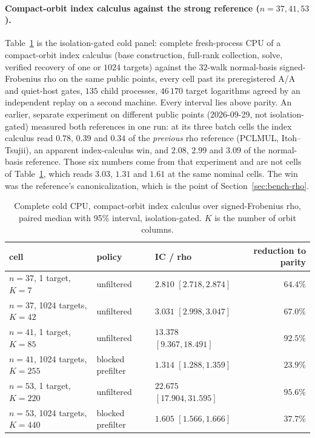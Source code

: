 \paragraph{Compact-orbit index calculus against the strong reference ($n=37,41,53$).}
Table~\ref{tab:cold} is the isolation-gated cold panel: complete
fresh-process CPU of a compact-orbit index calculus (base
construction, full-rank collection, solve, verified recovery of one or
$1024$ targets) against the $32$-walk normal-basis signed-Frobenius
rho on the same public points, every cell past its preregistered A/A
and quiet-host gates, $135$ child processes, $46\,170$ target
logarithms agreed by an independent replay on a second
machine.
Every interval lies above parity. An earlier, separate experiment on
different public points (2026-09-29, not isolation-gated) measured both
references in one run: at its three batch cells the index calculus
read $0.78$, $0.39$ and $0.34$ of the \emph{previous} rho reference
(PCLMUL, Itoh--Tsujii), an apparent index-calculus win, and $2.08$,
$2.99$ and $3.09$ of the normal-basis reference. Those six numbers
come from that experiment and are not cells of Table~\ref{tab:cold},
which reads $3.03$, $1.31$ and $1.61$ at the same nominal cells. The
win was the reference's canonicalization, which is the point of
Section~\ref{sec:bench-rho}.

\begin{table}[t]
\centering\small
\caption{Complete cold CPU, compact-orbit index calculus over signed-Frobenius rho, paired median with 95\% interval, isolation-gated. $K$ is the number of orbit columns.}
\label{tab:cold}
\begin{tabular}{@{}lllr@{}}
\toprule
cell & policy & IC / rho & reduction to parity \\
\midrule
$n=37$, 1 target, $K=7$ & unfiltered & $2.810$ $[2.718,2.874]$ & $64.4\%$ \\
$n=37$, 1024 targets, $K=42$ & unfiltered & $3.031$ $[2.998,3.047]$ & $67.0\%$ \\
$n=41$, 1 target, $K=85$ & unfiltered & $13.378$ $[9.367,18.491]$ & $92.5\%$ \\
$n=41$, 1024 targets, $K=255$ & blocked prefilter & $1.314$ $[1.288,1.359]$ & $23.9\%$ \\
$n=53$, 1 target, $K=220$ & unfiltered & $22.675$ $[17.904,31.595]$ & $95.6\%$ \\
$n=53$, 1024 targets, $K=440$ & blocked prefilter & $1.605$ $[1.566,1.666]$ & $37.7\%$ \\
\bottomrule
\end{tabular}
\end{table}

